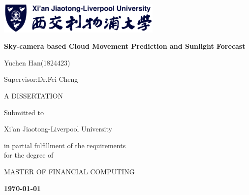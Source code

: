 

\begin{titlepage}

\begin{center}

\vspace*{1cm}
	\includegraphics[width=80mm]{XJTLU_Logo}\par\vspace{1cm}
		\vspace{2cm}

\LARGE \textbf{Sky-camera based Cloud Movement Prediction and Sunlight Forecast
}
\author{Yuchen Han(1824423)\\{\small Supervisor:Dr.Fei Cheng}}
%
\vspace{20mm}

\LARGE {Yuchen Han(1824423)
}

\vspace{10mm}

\Large {Supervisor:Dr.Fei Cheng
}
\vspace{20mm}


\LARGE A DISSERTATION
\vspace{10mm}

\Large Submitted to
\vspace{4mm}

\LARGE Xi'an Jiaotong-Liverpool University
\vspace{12mm}

\Large in partial fulfillment of the requirements\\
for the degree of
\vspace{5mm}

\Large MASTER OF FINANCIAL COMPUTING
\vspace{20mm}


\LARGE \textbf{\ddmmyyyydate \today
}
\end{center}


\end{titlepage}
